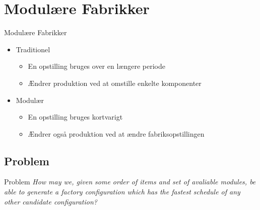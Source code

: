 \section{Modulære Fabrikker}

\begin{frame}{Modulære Fabrikker}{}
  
  \begin{itemize}
  \item<1-> Traditionel
    \begin{itemize}
    \item En opstilling bruges over en længere periode
    \item Ændrer produktion ved at omstille enkelte komponenter 
    \end{itemize}
  \item<2-> Modulær
    \begin{itemize}
    \item En opstilling bruges kortvarigt
    \item Ændrer også produktion ved at ændre fabriksopstillingen
    \end{itemize}
  \end{itemize}
\end{frame}

\subsection{Problem}

\begin{frame}{Problem}{}
\textit{How may we, given some order of items and set of avaliable modules, be able to
generate a factory configuration which has the fastest schedule of any other candidate
configuration?}
\end{frame}

